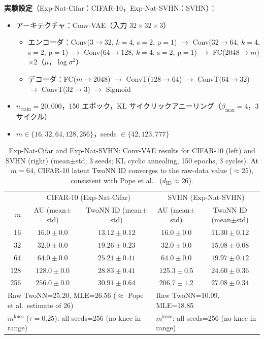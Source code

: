 \documentclass[11pt,a4paper]{jsarticle}
\newcommand{\mknee}{m^{\mathrm{knee}}}
\begin{document}
\textbf{実験設定}（Exp-Nat-Cifar：CIFAR-10，Exp-Nat-SVHN：SVHN）：
\begin{itemize}
  \item アーキテクチャ：Conv-VAE（入力 $32 \times 32 \times 3$）
        \begin{itemize}
          \item エンコーダ：Conv($3\to32$, $k=4$, s$=2$, p$=1$) $\to$ Conv($32\to64$, $k=4$, s$=2$, p$=1$) $\to$
                Conv($64\to128$, $k=4$, s$=2$, p$=1$) $\to$ FC($2048 \to m$) $\times 2$（$\mu$，$\log\sigma^2$）
          \item デコーダ：FC($m \to 2048$) $\to$ ConvT($128\to64$) $\to$ ConvT($64\to32$) $\to$ ConvT($32\to3$) $\to$ Sigmoid
        \end{itemize}
  \item $n_{\mathrm{train}} = 20{,}000$，150 エポック，KL サイクリックアニーリング（$\beta_{\max}=4$，3サイクル）
  \item $m \in \{16, 32, 64, 128, 256\}$，seeds $\in \{42, 123, 777\}$
\end{itemize}

\begin{table}[H]
\centering
\caption{Exp-Nat-Cifar and Exp-Nat-SVHN: Conv-VAE results for CIFAR-10 (left) and SVHN (right) (mean$\pm$std, 3 seeds; KL cyclic annealing, 150 epochs, 3 cycles). At $m=64$, CIFAR-10 latent TwoNN ID converges to the raw-data value ($\approx25$), consistent with Pope et al.\ \cite{pope2021intrinsic} ($d_\mathrm{ID} \approx 26$).}
\label{tab:ei_ej}
\small
\begin{tabular}{r cc | cc}
\toprule
 & \multicolumn{2}{c|}{CIFAR-10 (Exp-Nat-Cifar)} & \multicolumn{2}{c}{SVHN (Exp-Nat-SVHN)} \\
$m$ & AU (mean$\pm$std) & TwoNN ID (mean$\pm$std) & AU (mean$\pm$std) & TwoNN ID (mean$\pm$std) \\
\midrule
 16  & $16.0\pm0.0$ & $13.12\pm0.12$ & $16.0\pm0.0$ & $11.30\pm0.12$ \\
 32  & $32.0\pm0.0$ & $19.26\pm0.23$ & $32.0\pm0.0$ & $15.08\pm0.08$ \\
 64  & $64.0\pm0.0$ & $\mathbf{25.21\pm0.41}$ & $64.0\pm0.0$ & $19.97\pm0.12$ \\
128  & $128.0\pm0.0$ & $28.83\pm0.41$ & $125.3\pm0.5$ & $24.60\pm0.36$ \\
256  & $256.0\pm0.0$ & $30.91\pm0.64$ & $206.7\pm1.2$ & $27.08\pm0.34$ \\
\midrule
\multicolumn{3}{l|}{Raw TwoNN=25.20, MLE=26.56 ($\approx$ Pope et al.\ estimate of 26)} & \multicolumn{2}{l}{Raw TwoNN=10.09, MLE=18.85} \\
\multicolumn{3}{l|}{$\mknee$ ($\tau=0.25$): all seeds=256 (no knee in range)} & \multicolumn{2}{l}{$\mknee$: all seeds=256 (no knee in range)} \\
\bottomrule
\end{tabular}
\end{table}
\end{document}
